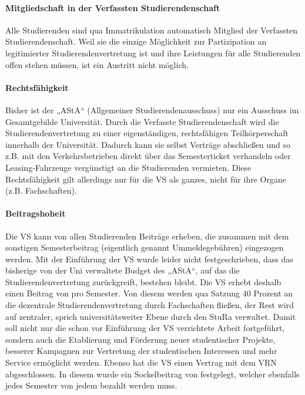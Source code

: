 \paragraph{Mitgliedschaft in der Verfassten Studierendenschaft}

Alle Studierenden sind qua Immatrikulation automatisch Mitglied der Verfassten Studierendenschaft. Weil sie die einzige Möglichkeit zur Partizipation an legitimierter Studierendenvertretung ist und ihre Leistungen für alle Studierenden offen stehen müssen, ist ein Austritt nicht möglich.

\paragraph{Rechtsfähigkeit}

Bisher ist der „AStA“ (Allgemeiner Studierendenausschuss) nur ein Ausschuss im Gesamtgebilde Universität. Durch die Verfasste Studierendenschaft wird die Studierendenvertretung zu einer eigenständigen, rechtsfähigen Teilkörperschaft innerhalb der Universität. Dadurch kann sie selbst Verträge abschließen und so z.B. mit den Verkehrsbetrieben direkt über das Semesterticket verhandeln oder Leasing-Fahrzeuge vergünstigt an die Studierenden vermieten. Diese Rechtsfähigkeit gilt allerdings nur für die VS als ganzes, nicht für ihre Organe (z.B. Fachschaften).

\paragraph{Beitragshoheit}

Die VS kann von allen Studierenden Beiträge erheben, die zusammen mit dem sonstigen Semesterbeitrag (eigentlich genannt Ummeldegebühren) eingezogen werden. Mit der Einführung der VS wurde leider nicht festgeschrieben, dass das bisherige von der Uni verwaltete Budget des „AStA“, auf das die Studierendenvertretung zurückgreift, bestehen bleibt. Die VS erhebt deshalb einen Beitrag von \EUR{\vsbeitrag} pro Semester. Von diesem werden qua Satzung 40 Prozent an die dezentrale Studierendenvertretung durch Fachschaften fließen, der Rest wird auf zentraler, sprich universitätsweiter Ebene durch den StuRa verwaltet. Damit soll nicht nur die schon vor Einführung der VS verrichtete Arbeit fortgeführt, sondern auch die Etablierung und Förderung neuer studentischer Projekte, besserer Kampagnen zur Vertretung der studentischen Interessen und mehr Service ermöglicht werden. Ebenso hat die VS einen Vertrag mit dem VRN abgeschlossen. In diesem wurde ein Sockelbeitrag von \EUR{\sockelbeitrag} festgelegt, welcher ebenfalls jedes Semester von jedem bezahlt werden muss.

